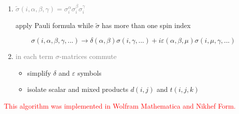 \documentclass[portratit,a1paper,fontscale=0.58]{baposter} %
\newcommand{\sqs}{\mbox{\fbox{$\sigma$}}}
\begin{document}
\begin{poster}
{\begin{enumerate}
\begin{enumerate}
\begin{enumerate}
\begin{enumerate}
				push spin index of $\sqs$ to the back of $\tilde\sigma$
				
				(\textcolor{green}{for example} $\tilde\sigma(i,\alpha,\beta)\sqs(i,\gamma)\rightarrow\tilde\sigma(i,\alpha,\beta,\gamma)$)
				\item else swap $\tilde\sigma$ and $\sqs$: $\tilde\sigma\sqs \rightarrow \sqs\tilde\sigma$
			\end{enumerate}
			\item if $\sqs$ is in first position, $\sqs\rightarrow\tilde\sigma$
		\end{enumerate}
	\end{enumerate}
	\item \textcolor{Gray}{$\tilde\sigma(i,\alpha,\beta,\gamma)=\sigma_i^\alpha \sigma_i^\beta \sigma_i^\gamma$}
	
	apply Pauli formula while $\tilde\sigma$ has more than one spin index
	
	$$\sigma(i,\alpha,\beta,\gamma,...)\rightarrow
	\delta(\alpha,\beta)\sigma(i,\gamma,...)+i \varepsilon(\alpha,\beta,\mu)\sigma(i,\mu,\gamma,...)$$
	
	\item \textcolor{Gray}{in each term $\sigma$-matrices commute}
	\begin{itemize}
		\item simplify $\delta$ and $\varepsilon$ symbols
		\item isolate scalar and mixed products $d(i,j)$ and $t(i,j,k)$
	\end{itemize}
\end{enumerate}

\textcolor{red}{This algorithm was implemented in Wolfram Mathematica and Nikhef Form.}
\vspace{0.5em}

}
\end{poster}
\end{document}
